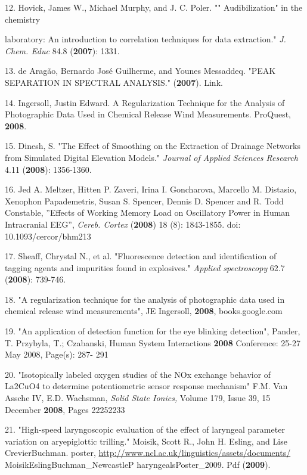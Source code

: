12. Hovick, James W., Michael Murphy, and J. C. Poler. "" Audibilization" in the chemistry

laboratory: An introduction to correlation techniques for data extraction." \textit{J. Chem. Educ} 84.8 (\textbf{2007}): 1331.

13. de Arag\~{a}o, Bernardo Jos\'{e} Guilherme, and Younes Messaddeq. "PEAK SEPARATION IN SPECTRAL ANALYSIS." (\textbf{2007}). Link.

14. Ingersoll, Justin Edward. A Regularization Technique for the Analysis of Photographic Data Used in Chemical Release Wind Measurements. ProQuest, \textbf{2008}.

15. Dinesh, S. "The Effect of Smoothing on the Extraction of Drainage Networks from Simulated Digital Elevation Models." \textit{Journal of Applied Sciences Research} 4.11 (\textbf{2008}): 1356-1360.

16. Jed A. Meltzer, Hitten P. Zaveri, Irina I. Goncharova, Marcello M. Distasio, Xenophon Papademetris, Susan S. Spencer, Dennis D. Spencer and R. Todd Constable, ''Effects of Working Memory Load on Oscillatory Power in Human Intracranial EEG'', \textit{Cereb. Cortex} (\textbf{2008}) 18 (8): 1843-1855. doi: 10.1093/cercor/bhm213

17. Sheaff, Chrystal N., et al. "Fluorescence detection and identification of tagging agents and impurities found in explosives." \textit{Applied spectroscopy} 62.7 (\textbf{2008}): 739-746.

18. "A regularization technique for the analysis of photographic data used in chemical release wind measurements", JE Ingersoll, \textbf{2008}, books.google.com

19. "An application of detection function for the eye blinking detection", Pander, T. Przybyla, T.; Czabanski, Human System Interactions \textbf{2008} Conference: 25-27 May 2008, Page(s): 287- 291

20. "Isotopically labeled oxygen studies of the NOx exchange behavior of La2CuO4 to determine potentiometric sensor response mechanism" F.M. Van Assche IV, E.D. Wachsman, \textit{Solid State Ionics,} Volume 179, Issue 39, 15 December \textbf{2008}, Pages 2225\textendash{}2233

21. "High-speed laryngoscopic evaluation of the effect of laryngeal parameter variation on aryepiglottic trilling." Moisik, Scott R., John H. Esling, and Lise CrevierBuchman. poster, \url{http://www.ncl.ac.uk/linguistics/assets/documents/} MoisikEslingBuchman\_NewcastleP haryngealsPoster\_2009. Pdf (\textbf{2009}).

